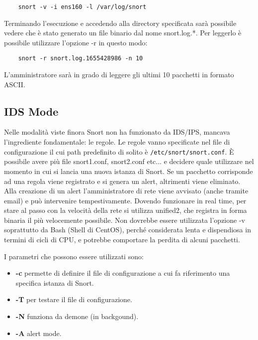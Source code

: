 \begin{verbatim}
    snort -v -i ens160 -l /var/log/snort
\end{verbatim}

Terminando l'esecuzione e accedendo alla directory specificata sarà possibile vedere che è stato generato un file binario dal nome snort.log.*. Per leggerlo è possibile utilizzare l'opzione -r in questo modo:

\begin{verbatim}
    snort -r snort.log.1655428986 -n 10
\end{verbatim}

L'amministratore sarà in grado di leggere gli ultimi 10 pacchetti in formato ASCII.

\subsection{IDS Mode}

Nelle modalità viste finora Snort non ha funzionato da IDS/IPS, mancava l'ingrediente fondamentale: le regole. Le regole vanno specificate nel file di configurazione il cui path predefinito di solito è \texttt{/etc/snort/snort.conf}. È possibile avere più file snort1.conf, snort2.conf etc... e decidere quale utilizzare nel momento in cui si lancia una nuova istanza di Snort. Se un pacchetto corrisponde ad una regola viene registrato e si genera un alert, altrimenti viene eliminato. Alla creazione di un alert l'amministratore di rete viene avvisato (anche tramite email) e può intervenire tempestivamente.
Dovendo funzionare in real time, per stare al passo con la velocità della rete si utilizza unified2, che registra in forma binaria il più velocemente possibile. Non dovrebbe essere utilizzata l'opzione -v soprattutto da Bash (Shell di CentOS), perché considerata lenta e dispendiosa in termini di cicli di CPU, e potrebbe comportare la perdita di alcuni pacchetti.

I parametri che possono essere utilizzati sono:

\begin{itemize}
    \item \textbf{-c} permette di definire il file di configurazione a cui fa riferimento una specifica istanza di Snort.
    \item \textbf{-T} per testare il file di configurazione.
    \item \textbf{-N} funziona da demone (in backgound).
    \item \textbf{-A} alert mode.
\end{itemize}

